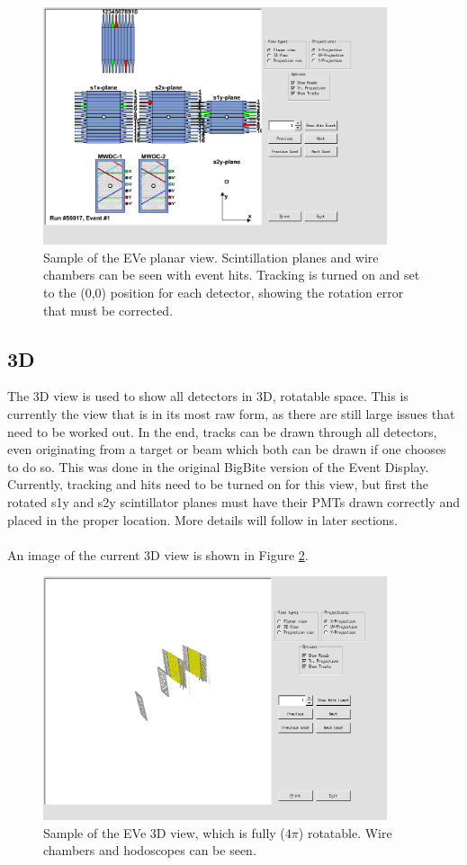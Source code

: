 \documentclass[12pt]{article}
\numberwithin{equation}{section}
\begin{document}
\begin{figure}[h!]
	\caption{Sample of the EVe planar view. Scintillation planes and wire chambers can be seen with event hits. Tracking is turned on and set to the (0,0) position for each detector, showing the rotation error that must be corrected.} \label{fig:planar}
	\centering
	\includegraphics[width=0.9\textwidth]{PlanarView.png} 
\end{figure}  

\subsection{3D}
The 3D view is used to show all detectors in 3D, rotatable space. This is currently the view that is in its most raw form, as there are still large issues that need to be worked out. In the end, tracks can be drawn through all detectors, even originating from a target or beam which both can be drawn if one chooses to do so. This was done in the original BigBite version of the Event Display. Currently, tracking and hits need to be turned on for this view, but first the rotated s1y and s2y scintillator planes must have their PMTs drawn correctly and placed in the proper location. More details will follow in later sections.
\\
\\
An image of the current 3D view is shown in Figure \ref{fig:3D}.
\begin{figure}[h!]
	\caption{Sample of the EVe 3D view, which is fully ($4\pi$) rotatable. Wire chambers and hodoscopes can be seen.} \label{fig:3D}
	\centering
	\includegraphics[width=0.9\textwidth]{3DView.png} 
\end{figure}  
\end{document}
